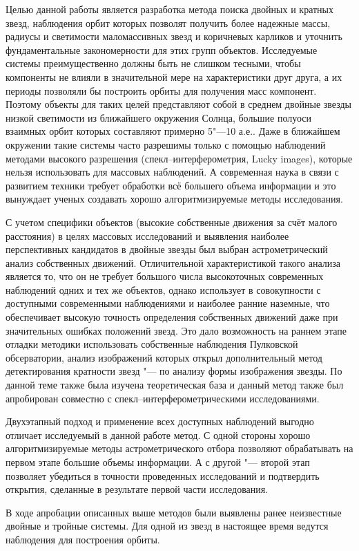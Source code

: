 Целью данной работы является разработка метода поиска двойных и кратных звезд, наблюдения орбит которых позволят получить более надежные массы, радиусы и светимости маломассивных звезд и коричневых карликов и уточнить фундаментальные закономерности для этих групп объектов. Исследуемые системы преимущественно должны быть не слишком тесными, чтобы компоненты не влияли в значительной мере на характеристики друг друга, а их периоды позволяли бы построить орбиты для получения масс компонент. Поэтому объекты для таких целей представляют собой в среднем двойные звезды низкой светимости из ближайшего окружения Солнца, большие полуоси взаимных орбит которых составляют примерно 5"---10 а.е.. Даже в ближайшем окружении такие системы часто разрешимы только  с помощью наблюдений методами высокого разрешения  (спекл--интерферометрия, Lucky images), которые нельзя использовать для массовых наблюдений. А современная наука в связи с развитием техники требует обработки всё большего объема информации и это вынуждает ученых создавать хорошо алгоритмизируемые методы исследования.

С учетом специфики объектов (высокие собственные движения за счёт малого расстояния) в целях массовых исследований и выявления наиболее перспективных кандидатов в двойные звезды был выбран астрометрический анализ собственных движений. Отличительной характеристикой  такого анализа является то, что он не требует большого числа высокоточных современных наблюдений одних и тех же объектов, однако использует в совокупности с доступными современными наблюдениями и наиболее ранние наземные, что обеспечивает высокую точность определения собственных движений даже при значительных ошибках положений звезд. Это дало возможность на раннем этапе отладки методики использовать собственные наблюдения Пулковской обсерватории, анализ изображений которых открыл дополнительный метод детектирования кратности звезд "--- по анализу формы изображения звезды. По данной теме также была изучена теоретическая база и данный метод также был апробирован совместно с спекл--интерферометрическими исследованиями.

Двухэтапный подход и применение всех доступных наблюдений выгодно отличает исследуемый в данной работе метод. С одной стороны хорошо алгоритмизируемые методы астрометрического отбора позволяют обрабатывать на первом этапе большие объемы информации. А с другой "--- второй этап позволяет убедиться в точности проведенных исследований и подтвердить открытия, сделанные в результате первой части исследования.

В ходе апробации описанных выше методов были выявлены ранее неизвестные двойные и тройные системы. Для одной из звезд в настоящее время ведутся наблюдения для построения орбиты.

